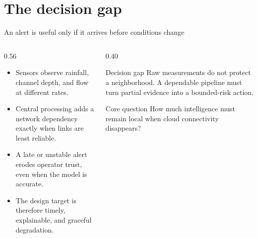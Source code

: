 \section{The decision gap}

\begin{frame}{An alert is useful only if it arrives before conditions change}
  \begin{columns}[T,onlytextwidth]
    \begin{column}{0.56\textwidth}
      \begin{itemize}[<+->]
        \item Sensors observe rainfall, channel depth, and flow at different rates.
        \item Central processing adds a network dependency exactly when links are least reliable.
        \item A late or unstable alert erodes operator trust, even when the model is accurate.
        \item The design target is therefore \alert{timely, explainable, and graceful degradation}.
      \end{itemize}
    \end{column}
    \begin{column}{0.40\textwidth}
      \begin{alertblock}{Decision gap}
        Raw measurements do not protect a neighborhood. A dependable pipeline must turn partial evidence into a bounded-risk action.
      \end{alertblock}
      \vspace{0.25cm}
      \begin{exampleblock}{Core question}
        How much intelligence must remain local when cloud connectivity disappears?
      \end{exampleblock}
    \end{column}
  \end{columns}
\end{frame}

